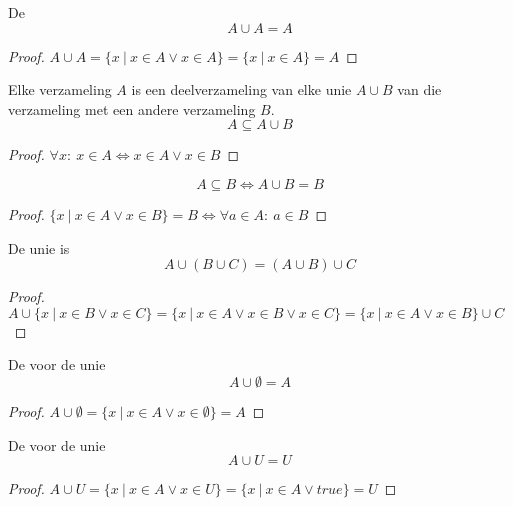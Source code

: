\documentclass[main.tex]{subfiles}
\begin{document}
\begin{ei}
  De 
  \[ A \cup A = A \]
  \begin{proof}
    $A \cup A = \{ x\ |\ x \in A \vee x \in A \} = \{ x\ |\ x \in A \} = A$
  \end{proof}
\end{ei}

\begin{st}
  Elke verzameling $A$ is een deelverzameling van elke unie $A \cup B$ van die verzameling met een andere verzameling $B$.
  \[ A \subseteq A \cup B \]
  
  \begin{proof}
    $\forall x:\ x \in A \Leftrightarrow x \in A \vee x \in B$
  \end{proof}
\end{st}

\begin{st}
  \[ A \subseteq B \Leftrightarrow A \cup B = B \]

  \begin{proof}
    $\{ x\ |\ x \in A \vee x \in B\} = B \Leftrightarrow \forall a\in A:\ a\in B$
  \end{proof}
\end{st}

\begin{st}
  De unie is 
  \[ A \cup (B \cup C) = (A \cup B) \cup C \]

  \begin{proof}
    $A \cup \{ x\ |\ x \in B \vee x \in C \} = \{ x\ |\ x \in A \vee x \in B \vee x \in C\} = \{ x\ |\ x \in A \vee x \in B\} \cup C$
  \end{proof}
\end{st}

\begin{st}
  De  voor de unie
  \[ A \cup \emptyset = A \]
  
  \begin{proof}
    $A \cup \emptyset = \{ x\ |\ x \in A \vee x \in \emptyset \} = A$
  \end{proof}
\end{st}

\begin{st}
  De  voor de unie
  \[ A \cup U = U \]
  \begin{proof}
    $A \cup U = \{ x\ |\ x \in A \vee x \in U\} = \{ x\ |\ x \in A \vee true \} = U$
  \end{proof}
\end{st}
\end{document}
